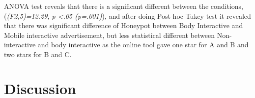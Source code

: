 \begin{table}[H]
\caption{Number of Honeypot effect in three weeks}
\label{tab:landingeffectthreeweeks}
\centering
{}
\end{table}


ANOVA test reveals that there is a significant different between the conditions,(\emph{(F2,5)=12.29, p <.05 (p=.001)}), and after doing Post-hoc Tukey test it revealed that there was significant difference of Honeypot between Body Interactive and Mobile interactive advertisement, but less statistical different between Non-interactive and body interactive as the online tool gave one star for A and B and two stars for B and C.

\begin{table}[H]
\caption{Post-Hoc Tukey’s HSD results}
\label{tab:honeypot-non-posthoctukey}
\centering
{}
\end{table}


\section{Discussion}



